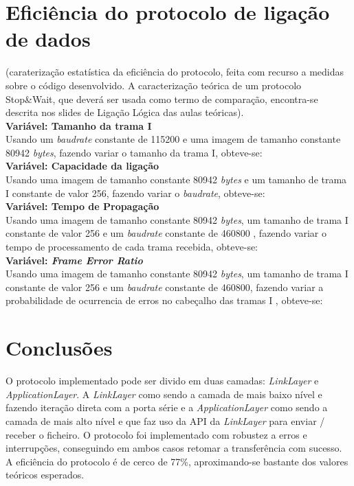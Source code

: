 \documentclass[a4paper, 11pt]{article}
\begin{document}
\section{Eficiência do protocolo de ligação de dados}

(caraterização estatística da  eficiência do protocolo, feita com recurso a medidas sobre o código desenvolvido. A caracterização teórica de um protocolo Stop\&Wait, que deverá ser usada como termo de comparação, encontra-se descrita nos slides de Ligação Lógica das aulas teóricas). \\

\textbf{Variável: Tamanho da trama I}\\
Usando um \textit{baudrate} constante de 115200 e uma imagem de tamanho constante 80942 \textit{bytes}, fazendo variar o tamanho da trama I, obteve-se:\\


\textbf{Variável: Capacidade da ligação}\\
Usando uma imagem de tamanho constante 80942 \textit{bytes} e um tamanho de trama I constante de valor 256, fazendo variar o \textit{baudrate}, obteve-se:\\

\textbf{Variável: Tempo de Propagação}\\
Usando uma imagem de tamanho constante 80942 \textit{bytes}, um tamanho de trama I constante de valor 256 e um \textit{baudrate} constante de 460800 , fazendo variar o tempo de processamento de cada trama recebida, obteve-se:\\

\textbf{Variável: \textit{Frame Error Ratio}}\\
Usando uma imagem de tamanho constante 80942 \textit{bytes}, um tamanho de trama I constante de valor 256 e um \textit{baudrate} constante de 460800, fazendo variar a probabilidade de ocurrencia de erros no cabeçalho das tramas I , obteve-se:\\

\section{Conclusões}

O protocolo implementado pode ser divido em duas camadas: \textit{LinkLayer} e \textit{ApplicationLayer}. A \textit{LinkLayer} como sendo a camada de mais baixo nível e fazendo iteração direta com a porta série e a \textit{ApplicationLayer} como sendo a camada de mais alto nível e que faz uso da API da \textit{LinkLayer} para enviar / receber o ficheiro. O protocolo foi implementado com robustez a erros e interrupções, conseguindo em ambos casos retomar a transferência com sucesso. A eficiência do protocolo é de cerco de 77\%, aproximando-se bastante dos valores teóricos esperados.
\end{document}
